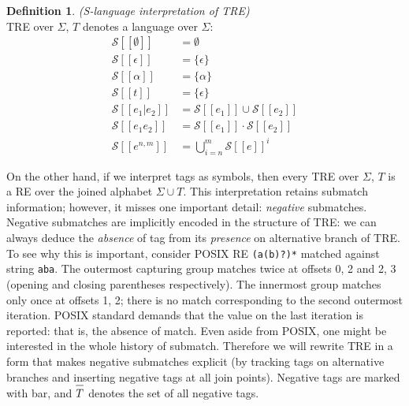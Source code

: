 \documentclass{article}
\newcommand{\Xlb}{[\![}
\newcommand{\Xrb}{]\!]}
\newcommand{\XS}{\mathcal{S}}
\newcommand*{\Xbar}[1]{\overline{#1\vphantom{\bar{#1}}}}
\theoremstyle{definition}
\newtheorem{Xdef}{Definition}
\begin{document}
\begin{multicols}{2}
    \begin{Xdef}\label{defslang}
    \emph{(S-language interpretation of TRE)} \\
    TRE over $\Sigma$, $T$ denotes a language over $\Sigma$:
    \begin{align*}
        \XS \Xlb \emptyset \Xrb &= \emptyset \\
        \XS \Xlb \epsilon \Xrb &= \{ \epsilon \} \\
        \XS \Xlb \alpha \Xrb &= \{\alpha\} \\
        \XS \Xlb t \Xrb &= \{\epsilon\} \\
        \XS \Xlb e_1 | e_2 \Xrb &= \XS \Xlb e_1 \Xrb \cup \XS \Xlb e_2 \Xrb \\
        \XS \Xlb e_1 e_2 \Xrb &= \XS \Xlb e_1 \Xrb \cdot \XS \Xlb e_2 \Xrb \\
        \XS \Xlb e^{n,m} \Xrb &= \bigcup\limits_{i=n}^m \XS \Xlb e \Xrb ^i
    \end{align*}
    \end{Xdef}

On the other hand, if we interpret tags as symbols, then every TRE over $\Sigma$, $T$ is a RE over the joined alphabet $\Sigma \cup T$.
This interpretation retains submatch information; however, it misses one important detail: \emph{negative} submatches.
Negative submatches are implicitly encoded in the structure of TRE:
we can always deduce the \emph{absence} of tag from its \emph{presence} on alternative branch of TRE.
To see why this is important, consider POSIX RE \texttt{(a(b)?)*} matched against string \texttt{aba}.
The outermost capturing group matches twice at offsets 0, 2 and 2, 3 (opening and closing parentheses respectively).
The innermost group matches only once at offsets 1, 2; there is no match corresponding to the second outermost iteration.
POSIX standard demands that the value on the last iteration is reported: that is, the absence of match.
Even aside from POSIX, one might be interested in the whole history of submatch.
Therefore we will rewrite TRE in a form that makes negative submatches explicit
(by tracking tags on alternative branches and inserting negative tags at all join points).
Negative tags are marked with bar, and $\Xbar{T}$ denotes the set of all negative tags.


\end{multicols}
\end{document}
